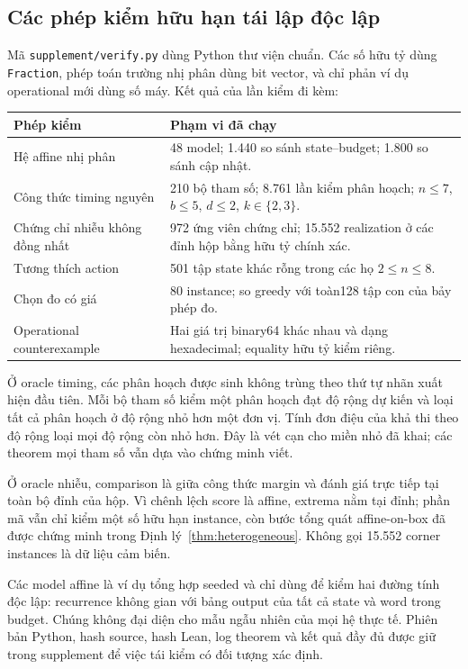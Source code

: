 \subsection{Các phép kiểm hữu hạn tái lập độc lập}
Mã \texttt{supplement/verify.py} dùng Python thư viện chuẩn. Các số hữu tỷ dùng \texttt{Fraction}, phép toán trường nhị phân dùng bit vector, và chỉ phản ví dụ operational mới dùng số máy. Kết quả của lần kiểm đi kèm:
\begin{center}
\begin{tabular}{p{}p{}}
\toprule Phép kiểm & Phạm vi đã chạy\\\midrule
Hệ affine nhị phân &48 model; 1.440 so sánh state--budget; 1.800 so sánh cập nhật.\\
Công thức timing nguyên &210 bộ tham số; 8.761 lần kiểm phân hoạch; $n\le7$, $b\le5$, $d\le2$, $k\in\{2,3\}$.\\
Chứng chỉ nhiễu không đồng nhất &972 ứng viên chứng chỉ; 15.552 realization ở các đỉnh hộp bằng hữu tỷ chính xác.\\
Tương thích action &501 tập state khác rỗng trong các họ $2\le n\le8$.\\
Chọn đo có giá &80 instance; so greedy với toàn128 tập con của bảy phép đo.\\
Operational counterexample &Hai giá trị binary64 khác nhau và dạng hexadecimal; equality hữu tỷ kiểm riêng.\\
\bottomrule
\end{tabular}
\end{center}
Ở oracle timing, các phân hoạch được sinh không trùng theo thứ tự nhãn xuất hiện đầu tiên. Mỗi bộ tham số kiểm một phân hoạch đạt độ rộng dự kiến và loại tất cả phân hoạch ở độ rộng nhỏ hơn một đơn vị. Tính đơn điệu của khả thi theo độ rộng loại mọi độ rộng còn nhỏ hơn. Đây là vét cạn cho miền nhỏ đã khai; các theorem mọi tham số vẫn dựa vào chứng minh viết.

Ở oracle nhiễu, comparison là giữa công thức margin và đánh giá trực tiếp tại toàn bộ đỉnh của hộp. Vì chênh lệch score là affine, extrema nằm tại đỉnh; phần mã vẫn chỉ kiểm một số hữu hạn instance, còn bước tổng quát affine-on-box đã được chứng minh trong Định lý~\ref{thm:heterogeneous}. Không gọi 15.552 corner instances là dữ liệu cảm biến.

Các model affine là ví dụ tổng hợp seeded và chỉ dùng để kiểm hai đường tính độc lập: recurrence không gian với bảng output của tất cả state và word trong budget. Chúng không đại diện cho mẫu ngẫu nhiên của mọi hệ thực tế. Phiên bản Python, hash source, hash Lean, log theorem và kết quả đầy đủ được giữ trong supplement để việc tái kiểm có đối tượng xác định.

